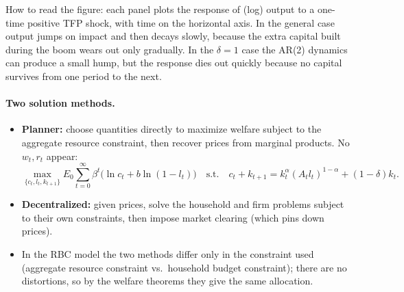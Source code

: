 \begin{center}
\end{center}
How to read the figure: each panel plots the response of (log) output to a one-time positive TFP shock, with time on the horizontal axis. In the general case output jumps on impact and then decays slowly, because the extra capital built during the boom wears out only gradually. In the $\delta=1$ case the AR(2) dynamics can produce a small hump, but the response dies out quickly because no capital survives from one period to the next.

\paragraph{Two solution methods.}
\begin{itemize}
  \item \textbf{Planner:} choose quantities directly to maximize welfare subject to the aggregate resource constraint, then recover prices from marginal products. No $w_t,r_t$ appear:
  \[
  \max_{\{c_t,l_t,k_{t+1}\}}E_0\sum_{t=0}^\infty\beta^t\big(\ln c_t+b\ln(1-l_t)\big)\quad\text{s.t.}\quad c_t+k_{t+1}=k_t^\alpha(A_tl_t)^{1-\alpha}+(1-\delta)k_t .
  \]
  \item \textbf{Decentralized:} given prices, solve the household and firm problems subject to their own constraints, then impose market clearing (which pins down prices).
  \item In the RBC model the two methods differ only in the constraint used (aggregate resource constraint vs.\ household budget constraint); there are no distortions, so by the welfare theorems they give the same allocation.
\end{itemize}

